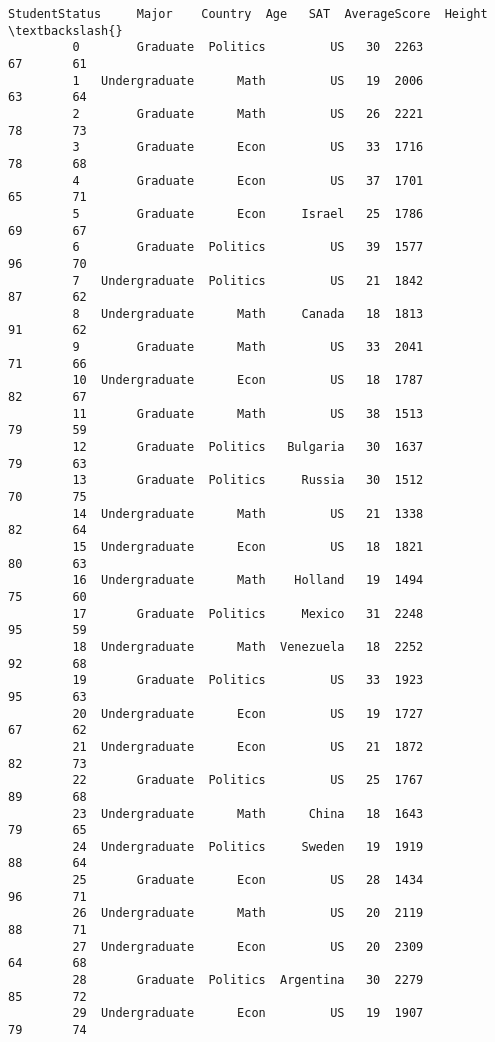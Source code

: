 \documentclass[11pt]{article}
\begin{document}
\begin{Verbatim}[commandchars=\\\{\}]
             StudentStatus     Major    Country  Age   SAT  AverageScore  Height   \textbackslash{}
         0        Graduate  Politics         US   30  2263            67       61   
         1   Undergraduate      Math         US   19  2006            63       64   
         2        Graduate      Math         US   26  2221            78       73   
         3        Graduate      Econ         US   33  1716            78       68   
         4        Graduate      Econ         US   37  1701            65       71   
         5        Graduate      Econ     Israel   25  1786            69       67   
         6        Graduate  Politics         US   39  1577            96       70   
         7   Undergraduate  Politics         US   21  1842            87       62   
         8   Undergraduate      Math     Canada   18  1813            91       62   
         9        Graduate      Math         US   33  2041            71       66   
         10  Undergraduate      Econ         US   18  1787            82       67   
         11       Graduate      Math         US   38  1513            79       59   
         12       Graduate  Politics   Bulgaria   30  1637            79       63   
         13       Graduate  Politics     Russia   30  1512            70       75   
         14  Undergraduate      Math         US   21  1338            82       64   
         15  Undergraduate      Econ         US   18  1821            80       63   
         16  Undergraduate      Math    Holland   19  1494            75       60   
         17       Graduate  Politics     Mexico   31  2248            95       59   
         18  Undergraduate      Math  Venezuela   18  2252            92       68   
         19       Graduate  Politics         US   33  1923            95       63   
         20  Undergraduate      Econ         US   19  1727            67       62   
         21  Undergraduate      Econ         US   21  1872            82       73   
         22       Graduate  Politics         US   25  1767            89       68   
         23  Undergraduate      Math      China   18  1643            79       65   
         24  Undergraduate  Politics     Sweden   19  1919            88       64   
         25       Graduate      Econ         US   28  1434            96       71   
         26  Undergraduate      Math         US   20  2119            88       71   
         27  Undergraduate      Econ         US   20  2309            64       68   
         28       Graduate  Politics  Argentina   30  2279            85       72   
         29  Undergraduate      Econ         US   19  1907            79       74   
         

\end{Verbatim}
\end{document}
